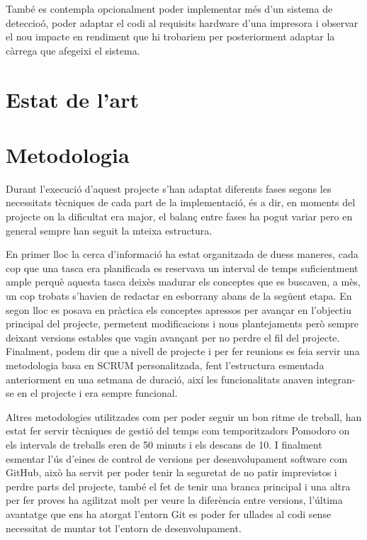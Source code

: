 ﻿\documentclass[10pt,a4paper,twocolumn,twoside]{article}
\begin{document}
També es contempla opcionalment poder implementar més d'un sistema de deteccioó, poder adaptar el codi al requisits hardware d'una impresora i observar el nou impacte en rendiment que hi trobariem per posteriorment adaptar la càrrega que afegeixi el sistema.
\section{Estat de l'art}

\section{Metodologia}

Durant l'execució d'aquest projecte s'han adaptat diferents fases segons les necessitats tècniques de cada part de la implementació, és a dir, en moments del projecte on la dificultat era major, el balanç entre fases ha pogut variar pero en general sempre han seguit la mteixa estructura.

En primer lloc la cerca d'informació ha estat organitzada de duess maneres, cada cop que una tasca era planificada es reservava un interval de temps suficientment ample perquè aquesta tasca deixès madurar els conceptes que es buscaven, a mès, un cop trobats s'havien de redactar en esborrany abans de la següent etapa. En segon lloc es posava en pràctica els conceptes apressos per avançar en l'objectiu principal del projecte, permetent modificacions i nous plantejaments però sempre deixant versions estables que vagin avançant per no perdre el fil del projecte. Finalment, podem dir que a nivell de projecte i per fer reunions es feia servir una metodologia basa en SCRUM personalitzada, fent l'estructura esmentada anteriorment en una setmana de duració, així les funcionalitats anaven integran-se en el projecte i era sempre funcional.

Altres metodologies utilitzades com per poder seguir un bon ritme de treball, han estat fer servir tècniques de gestió del temps com temporitzadors Pomodoro on els intervals de treballs eren de 50 minuts i els descans de 10. I finalment esmentar l'ús d'eines de control de versions per desenvolupament software com GitHub, això ha servit per poder tenir la seguretat de no patir imprevistos i perdre parts del projecte, també el fet de tenir una branca principal i una altra per fer proves ha agilitzat molt per veure la diferència entre versions, l'última avantatge que ens ha atorgat l'entorn Git es poder fer ullades al codi sense necessitat de muntar tot l'entorn de desenvolupament. 
\end{document}
